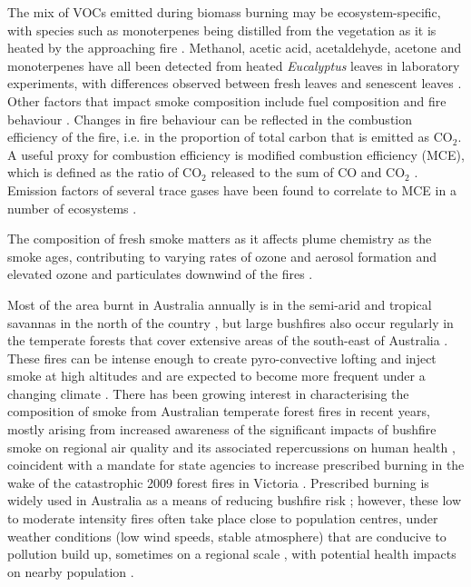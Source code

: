 \documentclass[acp, manuscript]{copernicus}
\begin{document}
The mix of VOCs emitted during biomass burning may be ecosystem-specific, with species such as monoterpenes being distilled from the vegetation as it is heated by the approaching fire \citep{Ciccioli2014}. Methanol, acetic acid, acetaldehyde, acetone and monoterpenes have all been detected from heated \textit{Eucalyptus} leaves in laboratory experiments, with differences observed between fresh leaves and senescent leaves \citep{Greenberg2006,Maleknia2007,Maleknia2009,Possell2013}. Other factors that impact smoke composition include fuel composition \citep[e.g. nitrogen content,][]{Coggon2016} and fire behaviour \citep[e.g.][]{Wooster2011}. %
Changes in fire behaviour can be reflected in the combustion efficiency of the fire, i.e. in the proportion of total carbon that is emitted as CO$_2$. A useful proxy for combustion efficiency is modified combustion efficiency (MCE), which is defined as the ratio of CO$_2$ released to the sum of CO and CO$_2$ \citep{Hao1993,Yokelson1996}. Emission factors of several trace gases have been found to correlate to MCE in a number of ecosystems \citep[e.g.][]{Akagi2013, Burling2011, Meyer2012}.

The composition of fresh smoke matters as it affects plume chemistry as the smoke ages, contributing to varying rates of ozone and aerosol formation \citep{Yokelson2009,Akagi2012,Alvarado2015} and elevated ozone and particulates downwind of the fires \citep{Pfister2008,Yan2008}.

Most of the area burnt in Australia annually is in the semi-arid and tropical savannas in the north of the country \citep{Russell-Smith2007}, but large bushfires also occur regularly in the temperate forests that cover extensive areas of the south-east of Australia \citep{Cai2009}. These fires can be intense enough to create pyro-convective lofting and inject smoke at high altitudes \citep{Fromm2006,Dirksen2009,Guan2010,Siddaway2011,DeLaat2012} and are expected to become more frequent under a changing climate \citep{Bradstock2009,Cai2009,Keywood2013,King2013}. There has been growing interest in characterising the composition of smoke from Australian temperate forest fires in recent years, mostly arising from increased awareness of the significant impacts of bushfire smoke on regional air quality \citep{Reisen2011,Reisen2013,Price2012,Keywood2015,Rea2016} and its associated repercussions on human health \citep{Reisen2006,Johnston2012,Johnston2014, Reisen2015, Reid2016}, coincident with a mandate for state agencies to increase prescribed burning in the wake of the catastrophic 2009 forest fires in Victoria \citep{Teague2010}. Prescribed burning is widely used in Australia as a means of reducing bushfire risk \citep{Boer2009}; however, these low to moderate intensity fires often take place close to population centres, under weather conditions (low wind speeds, stable atmosphere) that are conducive to pollution build up, sometimes on a regional scale \citep[e.g.,][Fig. 2]{Williamson2016}, with potential health impacts on nearby population \citep{Haikerwal2015}.
\end{document}
